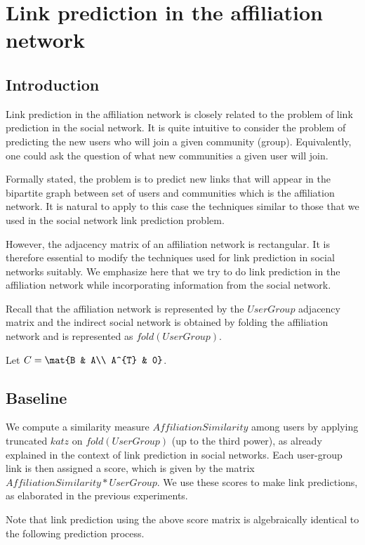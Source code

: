 \documentclass{report}
\begin{document}
\chapter{Link prediction in the affiliation network}
\section{Introduction}
Link prediction in the affiliation network is closely related to the problem of link prediction in the social network. It is quite intuitive to consider the problem of predicting the new users who will join a given community (group). Equivalently, one could ask the question of what new communities a given user will join. 

Formally stated, the problem is to predict new links that will appear in the bipartite graph between set of users and communities which is the affiliation network. It is natural to apply to this case the techniques similar to those that we used in the social network link prediction problem.

However, the adjacency matrix of an affiliation network is rectangular. It is therefore essential to modify the techniques used for link prediction in social networks suitably. We emphasize here that we try to do link prediction in the affiliation network while incorporating information from the social network. 

Recall that the affiliation network is represented by the $UserGroup$ adjacency matrix and the indirect social network is obtained by folding the affiliation network and is represented as $fold(UserGroup)$.


Let $C = \mat{B & A\\ A^{T} & 0}$.

\section{Baseline}
We compute a similarity measure $AffiliationSimilarity$ among users by applying truncated $katz$ on $fold(UserGroup)$ (up to the third power), as already explained in the context of link prediction in social networks. Each user-group link is then assigned a score, which is given by the matrix $AffiliationSimilarity*UserGroup$. We use these scores to make link predictions, as elaborated in the previous experiments.

Note that link prediction using the above score matrix is algebraically identical to the following prediction process. 
\end{document}
